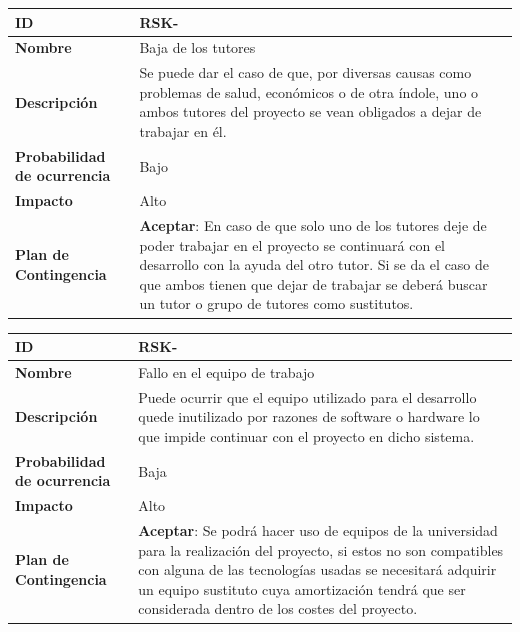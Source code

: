 \begin{center}
	\begin{tabular}{ | p{5.6cm} | p{8.5cm} | } 
		\hline
		
		\textbf{ID} & RSK-\arabic{contador_riesgos}
		{contador_riesgos} \\
		
		\hline 
		\textbf{Nombre} &
		Baja de los tutores\\ 
		
		\hline
		\textbf{Descripción} & 
		Se puede dar el caso de que, por diversas causas como problemas de salud, económicos o de otra índole, uno o ambos tutores del proyecto se vean obligados a dejar de trabajar en él.\\
		
		\hline 
		\textbf{Probabilidad de ocurrencia} &
		Bajo\\
		
		\hline 
		\textbf{Impacto} &
		Alto\\
		
		
		\hline 
		\textbf{Plan de Contingencia} &
		\textbf{Aceptar}: En caso de que solo uno de los tutores deje de poder trabajar en el proyecto se continuará con el desarrollo con la ayuda del otro tutor. Si se da el caso de que ambos tienen que dejar de trabajar se deberá buscar un tutor o grupo de tutores como sustitutos.\\
		
		
		\hline
	\end{tabular}
\end{center}

\begin{center}
	\begin{tabular}{ | p{5.6cm} | p{8.5cm} | } 
		\hline
		
		\textbf{ID} & RSK-\arabic{contador_riesgos}
		{contador_riesgos} \\
		
		\hline 
		\textbf{Nombre} &
		Fallo en el equipo de trabajo\\ 
		
		\hline
		\textbf{Descripción} & 
		Puede ocurrir que el equipo utilizado para el desarrollo quede inutilizado por razones de software o hardware lo que impide continuar con el proyecto en dicho sistema.\\
		
		\hline 
		\textbf{Probabilidad de ocurrencia} &
		Baja\\
		
		\hline 
		\textbf{Impacto} &
		Alto\\
		
		\hline 
		\textbf{Plan de Contingencia} &
		\textbf{Aceptar}: Se podrá hacer uso de equipos de la universidad para la realización del proyecto, si estos no son compatibles con alguna de las tecnologías usadas se necesitará adquirir un equipo sustituto cuya amortización tendrá que ser considerada dentro de los costes del proyecto.\\
		
		
		\hline
	\end{tabular}
\end{center}

